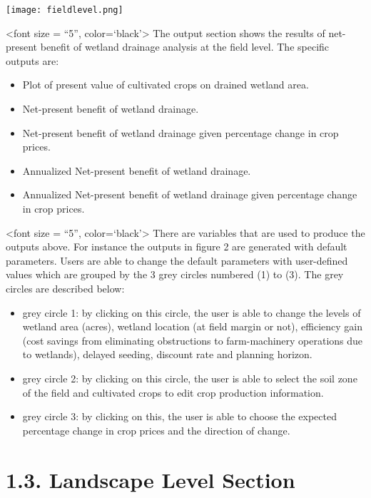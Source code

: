 \documentclass[
]{article}
\providecommand{\tightlist}{%
  \setlength{\itemsep}{0pt}\setlength{\parskip}{0pt}}
\begin{document}
\texttt{[image: fieldlevel.png]}

\textless font size = ``5'', color=`black'\textgreater{} The output
section shows the results of net-present benefit of wetland drainage
analysis at the field level. The specific outputs are:

\begin{itemize}
\tightlist
\item
  Plot of present value of cultivated crops on drained wetland area.
\item
  Net-present benefit of wetland drainage.\\
\item
  Net-present benefit of wetland drainage given percentage change in
  crop prices.
\item
  Annualized Net-present benefit of wetland drainage.\\
\item
  Annualized Net-present benefit of wetland drainage given percentage
  change in crop prices.
\end{itemize}

\textless font size = ``5'', color=`black'\textgreater{} There are
variables that are used to produce the outputs above. For instance the
outputs in figure 2 are generated with default parameters. Users are
able to change the default parameters with user-defined values which are
grouped by the 3 grey circles numbered (1) to (3). The grey circles are
described below:

\begin{itemize}
\tightlist
\item
  grey circle 1: by clicking on this circle, the user is able to change
  the levels of wetland area (acres), wetland location (at field margin
  or not), efficiency gain (cost savings from eliminating obstructions
  to farm-machinery operations due to wetlands), delayed seeding,
  discount rate and planning horizon.\\
\item
  grey circle 2: by clicking on this circle, the user is able to select
  the soil zone of the field and cultivated crops to edit crop
  production information.\\
\item
  grey circle 3: by clicking on this, the user is able to choose the
  expected percentage change in crop prices and the direction of change.
\end{itemize}

\hypertarget{landscape-level-section}{%
\section{\texorpdfstring{ 1.3. Landscape Level Section
}{ 1.3. Landscape Level Section }}\label{landscape-level-section}}
\end{document}
